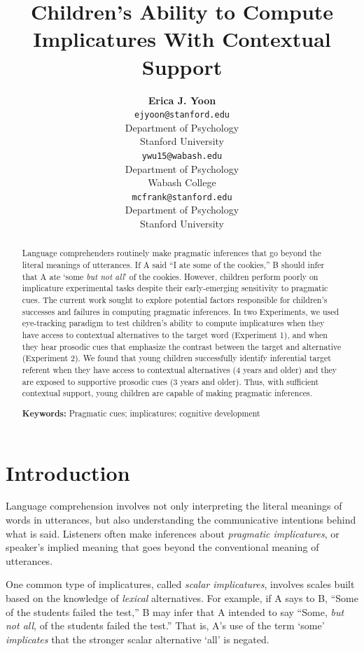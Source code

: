 \documentclass[10pt,letterpaper]{article}
\title{Children's Ability to Compute Implicatures \linebreak With Contextual Support}
\author{{\large \bf Erica J. Yoon} \\ \texttt{ejyoon@stanford.edu} \\
  Department of Psychology \\
  Stanford University
  \And {\large \bf Charles Y. Wu} \\ \texttt{ywu15@wabash.edu} \\
  Department of Psychology \\
  Wabash College
  \And {\large \bf Michael C. Frank} \\ \texttt{mcfrank@stanford.edu} \\
  Department of Psychology \\
  Stanford University}
\begin{document}
\maketitle


\begin{abstract}
Language comprehenders routinely make pragmatic inferences that go beyond the literal meanings of utterances. If A said ``I ate some of the cookies,'' B should infer that A ate `some \emph{but not all}' of the cookies. However, children perform poorly on implicature experimental tasks despite their early-emerging sensitivity to pragmatic cues. The current work sought to explore potential factors responsible for children's successes and failures in computing pragmatic inferences. In two Experiments, we used eye-tracking paradigm to test children's ability to compute implicatures when they have access to contextual alternatives to the target word (Experiment 1), and when they hear prosodic cues that emphasize the contrast between the target and alternative (Experiment 2). We found that young children successfully identify inferential target referent when they have access to contextual alternatives (4 years and older) and they are exposed to supportive prosodic cues (3 years and older). Thus, with sufficient contextual support, young children are capable of making pragmatic inferences.

\textbf{Keywords:} 
Pragmatic cues; implicatures; cognitive development

\end{abstract}


\section{Introduction}

Language comprehension involves not only interpreting the literal meanings of words in utterances, but also understanding the communicative intentions behind what is said. Listeners often make inferences about \emph{pragmatic implicatures}, or speaker's implied meaning that goes beyond the conventional meaning of utterances\cite{grice1975logic}. 

One common type of implicatures, called  \emph{scalar implicatures}, involves scales built based on the knowledge of \emph{lexical} alternatives. For example, if A says to B, ``Some of the students failed the test,'' B may infer that A intended to say ``Some, \emph{but not all}, of the students failed the test.'' That is, A's use of the term `some' \emph{implicates} that the stronger scalar alternative `all' is negated. 
\end{document}
